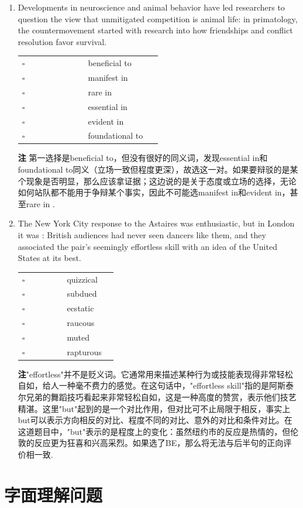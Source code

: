 \documentclass[11pt,space]{ctexart}
\newcommand{\note}[1]{{\heiti\textbf{注\hspace{1em}}}#1.}
\newcommand{\senequiv}[6]{
\begin{center}
\begin{tabularx}{\linewidth}{>{\raggedleft\arraybackslash}p{0.4\linewidth} p{0.45\linewidth}}
    $\square$ & {#1} \\
    $\square$ & {#2} \\
    $\square$ & {#3} \\
    $\square$ & {#4} \\
    $\square$ & {#5} \\
    $\square$ & {#6} \\
\end{tabularx}
\end{center}
}
\begin{document}
\begin{enumerate}
\item Developments in neuroscience and animal behavior have led researchers to question the view that unmitigated competition is \blank{} animal life: in primatology, the countermovement started with research into how friendships and conflict resolution favor survival.
\senequiv{beneficial to}{manifest in}{rare in}{essential in}{evident in}{foundational to}
\note{
第一选择是beneficial to，但没有很好的同义词，发现essential in和foundational to同义（立场一致但程度更深），故选这一对。如果要辩驳的是某个现象是否明显，那么应该拿证据；这边说的是关于态度或立场的选择，无论如何站队都不能用于争辩某个事实，因此不可能选manifest in和evident in，甚至rare in
}

\item The New York City response to the Astaires was enthusiastic, but in London it was \blank{}: British audiences had never seen dancers like them, and they associated the pair's seemingly effortless skill with an idea of the United States at its best.
\senequiv{quizzical}{subdued}{ecstatic}{raucous}{muted}{rapturous}
\note{"effortless"并不是贬义词。它通常用来描述某种行为或技能表现得非常轻松自如，给人一种毫不费力的感觉。在这句话中，"effortless skill"指的是阿斯泰尔兄弟的舞蹈技巧看起来非常轻松自如，这是一种高度的赞赏，表示他们技艺精湛。这里"but"起到的是一个对比作用，但对比可不止局限于相反，事实上but可以表示方向相反的对比、程度不同的对比、意外的对比和条件对比。在这道题目中，"but"表示的是程度上的变化：虽然纽约市的反应是热情的，但伦敦的反应更为狂喜和兴高采烈。如果选了BE，那么将无法与后半句的正向评价相一致}

\end{enumerate}

\newpage
\section*{字面理解问题}
\end{document}
